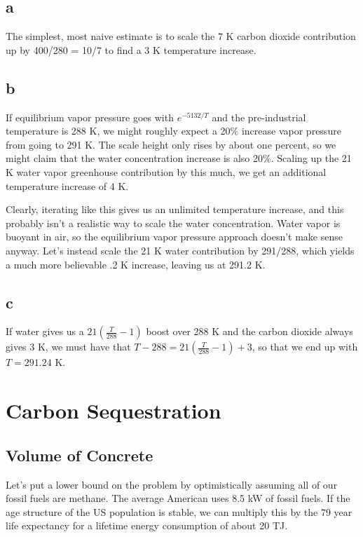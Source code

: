 \documentclass[12pt]{article}
\begin{document}
\subsection{a}

The simplest, most naive estimate is to scale the 7 K carbon dioxide contribution up by 400/280 = 10/7 to find a 3 K temperature increase.

\subsection{b}

If equilibrium vapor pressure goes with \(e^{-5132/T}\) and the pre-industrial temperature is 288 K, we might roughly expect a 20\% increase vapor pressure from going to 291 K. The scale height only rises by about one percent, so we might claim that the water concentration increase is also 20\%. Scaling up the 21 K water vapor greenhouse contribution by this much, we get an additional temperature increase of 4 K.

Clearly, iterating like this gives us an unlimited temperature increase, and this probably isn't a realistic way to scale the water concentration. Water vapor is buoyant in air, so the equilibrium vapor pressure approach doesn't make sense anyway. Let's instead scale the 21 K water contribution by 291/288, which yields a much more believable .2 K increase, leaving us at 291.2 K.

\subsection{c}

If water gives us a \(21(\frac{T}{288}-1)\) boost over 288 K and the carbon dioxide always gives 3 K, we must have that \(T - 288 = 21(\frac{T}{288}-1) + 3\), so that we end up with \(T = 291.24\) K.
 

\section{Carbon Sequestration}

\subsection{Volume of Concrete}

Let's put a lower bound on the problem by optimistically assuming all of our fossil fuels are methane. The average American uses 8.5 kW of fossil fuels. If the age structure of the US population is stable, we can multiply this by the 79 year life expectancy for a lifetime energy consumption of about 20 TJ.
\end{document}
